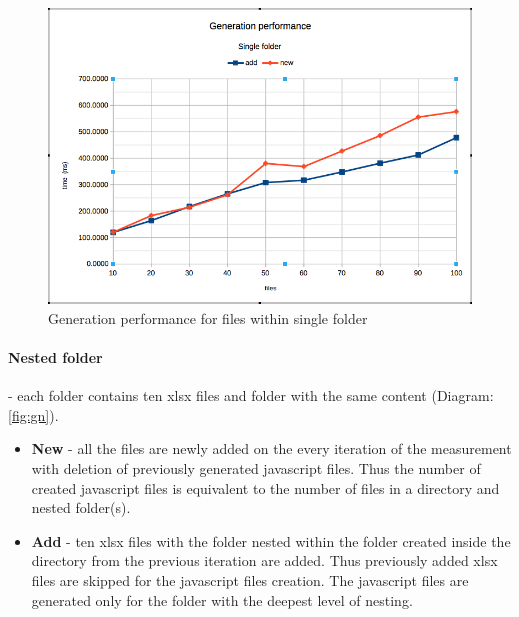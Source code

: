 \begin{figure}[ht]
	\label{fig:gs}
	\centering
	\includegraphics[width=\textwidth]{grafiken/generation_single}
	\caption{Generation performance for files within single folder}
\end{figure}

\paragraph{Nested folder} - each folder contains ten xlsx files and folder with the same content (Diagram: \ref{fig:gn}).
\begin{itemize}
	\item \textbf{New} - all the files are newly added on the every iteration of the measurement with deletion of previously generated javascript files. Thus the number of created javascript files is equivalent to the number of files in a directory and nested folder(s).
	\item \textbf{Add} - ten xlsx files with the folder nested within the folder created inside the directory from the previous iteration are added. Thus previously added xlsx files are skipped for  the javascript files creation. The javascript files are generated only for the folder with the deepest level of nesting.
\end{itemize}


